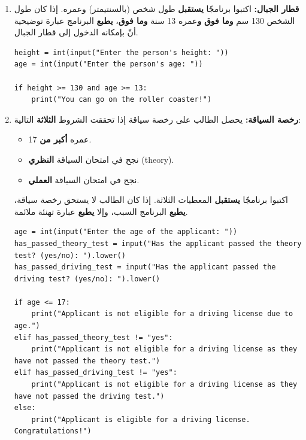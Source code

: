 \documentclass[14pt]{extarticle}
\begin{document}
\begin{enumerate}[resume, label=\textbf{تمرين \arabic*:}, wide=0pt, itemsep=2.2em]
\filbreak
\fi

\item \textbf{قطار الجبال:} اكتبوا برنامجًا \textbf{يستقبل} طول شخص (بالسنتيمتر) وعمره. إذا كان طول الشخص 130 سم \textbf{وما فوق} \textbf{و}عمره 13 سنة \textbf{وما فوق}، \textbf{يطبع} البرنامج عبارة توضيحية أنّ بإمكانه الدخول إلى قطار الجبال.

\ifwithsols
\begin{boxSolution}
\begin{english}
\begin{verbatim}
height = int(input("Enter the person's height: "))
age = int(input("Enter the person's age: "))

if height >= 130 and age >= 13:
    print("You can go on the roller coaster!")
\end{verbatim}
\end{english}
\end{boxSolution}

\filbreak
\fi

\item \textbf{رخصة السياقة:} يحصل الطالب على رخصة سياقة إذا تحققت الشروط \textbf{الثلاثة} التالية:

\begin{itemize}[itemsep=0.3em]
\item عمره \textbf{أكبر من} 17.
\item نجح في امتحان السياقة \textbf{النظري} (\textenglish{theory}).
\item نجح في امتحان السياقة \textbf{العملي}.
\end{itemize}

اكتبوا برنامجًا \textbf{يستقبل} المعطيات الثلاثة. إذا كان الطالب لا يستحق رخصة سياقة، \textbf{يطبع} البرنامج السبب، وإلا \textbf{يطبع} عبارة تهنئة ملائمة.

\ifwithsols
\begin{boxSolution}
\begin{english}
\begin{verbatim}
age = int(input("Enter the age of the applicant: "))
has_passed_theory_test = input("Has the applicant passed the theory test? (yes/no): ").lower()
has_passed_driving_test = input("Has the applicant passed the driving test? (yes/no): ").lower()

if age <= 17:
    print("Applicant is not eligible for a driving license due to age.")
elif has_passed_theory_test != "yes":
    print("Applicant is not eligible for a driving license as they have not passed the theory test.")
elif has_passed_driving_test != "yes":
    print("Applicant is not eligible for a driving license as they have not passed the driving test.")
else:
    print("Applicant is eligible for a driving license. Congratulations!")
\end{verbatim}
\end{english}
\end{boxSolution}


\end{enumerate}
\end{document}
